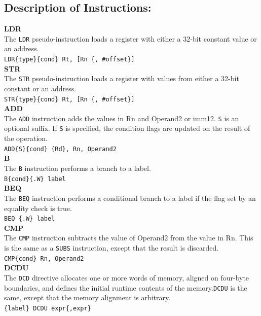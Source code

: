 \documentclass[12pt]{article}
\begin{document}
\subsection{Description of Instructions:}
\textbf{LDR}\\
The \verb|LDR| pseudo-instruction loads a register with either a 32-bit constant value or an address.\\
\verb|LDR{type}{cond} Rt, [Rn {, #offset}]| \\
\textbf{STR}\\
The \verb|STR| pseudo-instruction loads a register with values from either a 32-bit constant or an address.\\
\verb|STR{type}{cond} Rt, [Rn {, #offset}]|\\  
\textbf{ADD}\\
The \verb|ADD| instruction adds the values in Rn and Operand2 or imm12. \verb|S| is an optional suffix. If \verb|S| is specified, the condition flags are updated on the result of the operation.\\
\verb|ADD{S}{cond} {Rd}, Rn, Operand2|\\
\textbf{B}\\
The \verb|B| instruction performs a branch to a label.\\
\verb|B{cond}{.W} label|\\
\textbf{BEQ}\\
The \verb|BEQ| instruction performs a conditional branch to a label if the flag set by an equality check is true.\\
\verb|BEQ {.W} label|\\
\textbf{CMP}\\
The \verb|CMP| instruction subtracts the value of Operand2 from the value in Rn. This is the same as a \verb|SUBS| instruction, except that the result is discarded.\\
\verb|CMP{cond} Rn, Operand2|\\
\textbf{DCDU}\\
The \verb|DCD| directive allocates one or more words of memory, aligned on four-byte boundaries, and defines the initial runtime contents of the memory.\verb|DCDU| is the same, except that the memory alignment is arbitrary.\\
\verb|{label} DCDU expr{,expr}|\\
\pagebreak
\end{document}
